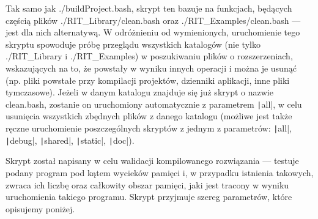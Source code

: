 Tak samo jak \textsf{./buildProject.bash}, skrypt ten bazuje na funkcjach, będących częścią plików \textsf{./RIT\_Library/clean.bash} oraz \textsf{./RIT\_Examples/clean.bash} --- jest dla nich alternatywą. W odróżnieniu od wymienionych, uruchomienie tego skryptu spowoduje próbę przeglądu wszystkich katalogów (nie tylko \textsf{./RIT\_Library} i \textsf{./RIT\_Examples}) w poszukiwaniu plików o rozszerzeniach, wskazujących na to, że powstały w wyniku innych operacji i można je usunąć (np. pliki powstałe przy kompilacji projektów, dzienniki aplikacji, inne pliki tymczasowe). Jeżeli w danym katalogu znajduje się już skrypt o nazwie \textsf{clean.bash}, zostanie on uruchomiony automatycznie z parametrem \texttt|all|, w celu usunięcia wszystkich zbędnych plików z danego katalogu (możliwe jest także ręczne uruchomienie poszczególnych skryptów z jednym z parametrów: \texttt|all|, \texttt|debug|, \texttt|shared|, \texttt|static|, \texttt|doc|).

Skrypt został napisany w celu walidacji kompilowanego rozwiązania --- testuje podany program pod kątem wycieków pamięci i, w przypadku istnienia takowych, zwraca ich liczbę oraz całkowity obszar pamięci, jaki jest tracony w wyniku uruchomienia takiego programu. Skrypt przyjmuje szereg parametrów, które opisujemy poniżej.


